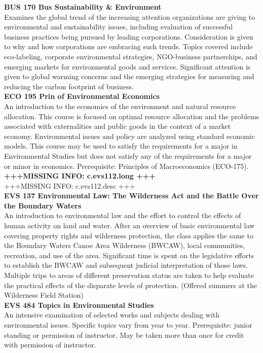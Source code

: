 \documentclass[
  letterpaper,
]{scrbook}
\begin{document}
\textbf{BUS 170 Bus Sustainability \& Environment}\\
Examines the global trend of the increasing attention organizations are
giving to environmental and sustainability issues, including evaluation
of successful business practices being pursued by leading corporations.
Consideration is given to why and how corporations are embracing such
trends. Topics covered include eco-labeling, corporate environmental
strategies, NGO-business partnerships, and emerging markets for
environmental goods and services. Significant attention is given to
global warming concerns and the emerging strategies for measuring and
reducing the carbon footprint of business.\\
\textbf{ECO 195 Prin of Environmental Economics}\\
An introduction to the economics of the environment and natural resource
allocation. This course is focused on optimal resource allocation and
the problems associated with externalities and public goods in the
context of a market economy. Environmental issues and policy are
analyzed using standard economic models. This course may be used to
satisfy the requirements for a major in Environmental Studies but does
not satisfy any of the requirements for a major or minor in economics.
Prerequisite: Principles of Macroeconomics (ECO-175).\\
\textbf{+++MISSING INFO: c.evs112.long +++}\\
+++MISSING INFO: c.evs112.desc +++\\
\textbf{EVS 137 Environmental Law: The Wilderness Act and the Battle
Over the Boundary Waters}\\
An introduction to environmental law and the effort to control the
effects of human activity on land and water. After an overview of basic
environmental law covering property rights and wilderness protection,
the class applies the same to the Boundary Waters Canoe Area Wilderness
(BWCAW), local communities, recreation, and use of the area. Significant
time is spent on the legislative efforts to establish the BWCAW and
subsequent judicial interpretation of those laws. Multiple trips to
areas of different preservation status are taken to help evaluate the
practical effects of the disparate levels of protection. (Offered
summers at the Wilderness Field Station)\\
\textbf{EVS 484 Topics in Environmental Studies}\\
An intensive examination of selected works and subjects dealing with
environmental issues. Specific topics vary from year to year.
Prerequisite: junior standing or permission of instructor. May be taken
more than once for credit with permission of instructor.
\end{document}

